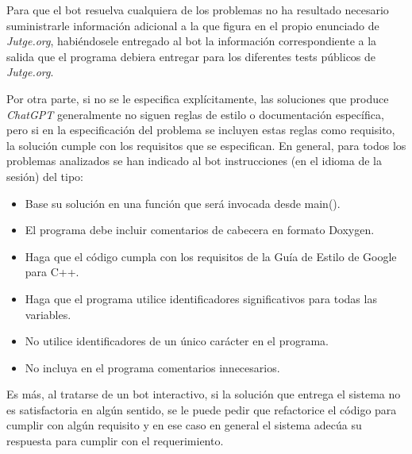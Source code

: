 \documentclass[twocolumn,twoside,a4paper, 10pt]{article}
\newcommand{\jutge}{\textit{Jutge.org}{}}           %
\newcommand{\ChatGPT}{\textit{ChatGPT}{}}           %
\begin{document}

Para que el bot resuelva cualquiera de los problemas no ha resultado necesario suministrarle información
adicional a la que figura en el propio enunciado de \jutge{}, habiéndosele entregado al bot la información
correspondiente a la salida que el programa debiera entregar para los diferentes tests públicos de \jutge{}.

Por otra parte, si no se le especifica explícitamente, las soluciones que produce \ChatGPT{} generalmente no
siguen reglas de estilo o documentación específica, pero si en la especificación del problema se incluyen
estas reglas como requisito, la solución cumple con los requisitos que se especifican.
En general, para todos los problemas analizados se han indicado al bot instrucciones (en el idioma de la
sesión) del tipo:
\begin{center}
    \begin{minipage}{\linewidth}
        {\small
        \begin{itemize}
          \item Base su solución en una función que será invocada desde main().
          \item El programa debe incluir comentarios de cabecera en formato Doxygen.
          \item Haga que el código cumpla con los requisitos de la Guía de Estilo de Google para C++.
          \item Haga que el programa utilice identificadores significativos para todas las variables.
          \item No utilice identificadores de un único carácter en el programa.
          \item No incluya en el programa comentarios innecesarios.
        \end{itemize}
        }
    \end{minipage}
\end{center}
Es más, al tratarse de un bot interactivo, si la solución que entrega el sistema no es satisfactoria en algún
sentido, se le puede pedir que refactorice el código para cumplir con algún requisito y en ese caso en general
el sistema adecúa su respuesta para cumplir con el requerimiento.
\end{document}
